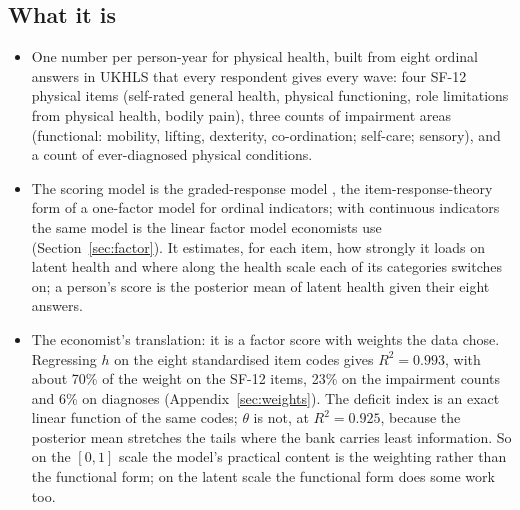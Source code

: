 \documentclass[11pt]{article}
\begin{document}
\subsection{What it is}
\begin{itemize}
\item One number per person-year for physical health, built from eight ordinal answers in UKHLS that every respondent gives every wave: four SF-12 physical items (self-rated general health, physical functioning, role limitations from physical health, bodily pain), three counts of impairment areas (functional: mobility, lifting, dexterity, co-ordination; self-care; sensory), and a count of ever-diagnosed physical conditions.
\item The scoring model is the graded-response model \citep{samejima1969}, the item-response-theory form of a one-factor model for ordinal indicators; with continuous indicators the same model is the linear factor model economists use (Section~\ref{sec:factor}). It estimates, for each item, how strongly it loads on latent health and where along the health scale each of its categories switches on; a person's score is the posterior mean of latent health given their eight answers.
\item The economist's translation: it is a factor score with weights the data chose. Regressing $h$ on the eight standardised item codes gives $R^2 = 0.993$, with about 70\% of the weight on the SF-12 items, 23\% on the impairment counts and 6\% on diagnoses (Appendix~\ref{sec:weights}). The deficit index is an exact linear function of the same codes; $\theta$ is not, at $R^2 = 0.925$, because the posterior mean stretches the tails where the bank carries least information. So on the $[0,1]$ scale the model's practical content is the weighting rather than the functional form; on the latent scale the functional form does some work too.
\end{itemize}
\end{document}
